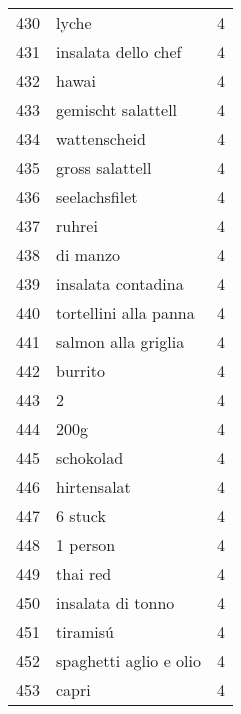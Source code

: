 \begin{tabular}{llr}
430  &                                              lyche &      4 \\
431  &                                insalata dello chef &      4 \\
432  &                                              hawai &      4 \\
433  &                                 gemischt salattell &      4 \\
434  &                                       wattenscheid &      4 \\
435  &                                    gross salattell &      4 \\
436  &                                      seelachsfilet &      4 \\
437  &                                             ruhrei &      4 \\
438  &                                           di manzo &      4 \\
439  &                                 insalata contadina &      4 \\
440  &                              tortellini alla panna &      4 \\
441  &                                salmon alla griglia &      4 \\
442  &                                            burrito &      4 \\
443  &                                                  2 &      4 \\
444  &                                               200g &      4 \\
445  &                                          schokolad &      4 \\
446  &                                        hirtensalat &      4 \\
447  &                                            6 stuck &      4 \\
448  &                                           1 person &      4 \\
449  &                                           thai red &      4 \\
450  &                                  insalata di tonno &      4 \\
451  &                                           tiramisú &      4 \\
452  &                             spaghetti aglio e olio &      4 \\
453  &                                              capri &      4 \\

\end{tabular}
